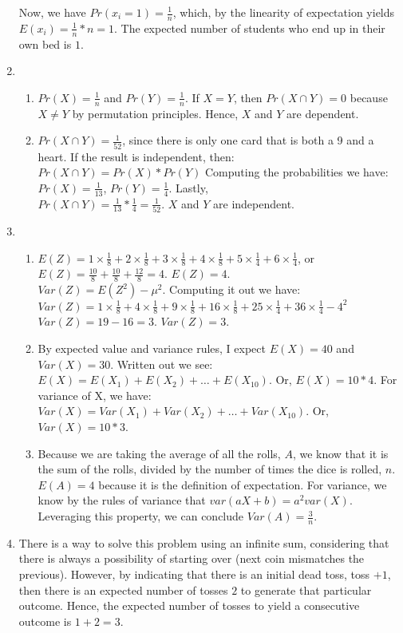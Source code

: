 \documentclass[12pt]{article}
\theoremstyle{plain}
\theoremstyle{definition}
\numberwithin{equation}{theorem}
\begin{document}
\begin{enumerate}
Now, we have $Pr(x_{i}=1)=\frac{1}{n}$, which, by the linearity of expectation yields $E(x_{i})=\frac{1}{n}*n = 1$. The expected number of students who end up in their own bed is $1$.
\item
	\begin{enumerate}
	\item $Pr(X) = \frac{1}{n}$ and $Pr(Y) = \frac{1}{n}$. If $X=Y$, then $Pr(X\cap Y)=0$ because $X \neq Y$ by permutation principles. Hence, $X$ and $Y$ are dependent.
	\addtocounter{enumii}{1}
	\item $Pr(X\cap Y) = \frac{1}{52}$, since there is only one card that is both a 9 and a heart. If the result is independent, then:\\
	$Pr(X\cap Y) = Pr(X)*Pr(Y)$ Computing the probabilities we have:\\
	$Pr(X) = \frac{1}{13}$, $Pr(Y) = \frac{1}{4}$. Lastly, \\
	$Pr(X\cap Y) = \frac{1}{13} * \frac{1}{4} = \frac{1}{52}$. $X$ and $Y$ are independent.
	\end{enumerate}
\item
	\begin{enumerate}
	\item $E(Z) = 1\times \frac{1}{8} + 2\times \frac{1}{8} + 3\times \frac{1}{8} + 4\times \frac{1}{8} + 5\times \frac{1}{4} + 6\times \frac{1}{4}$, or \\
$E(Z) = \frac{10}{8} +  \frac{10}{8} +  \frac{12}{8} = 4$. $E(Z)=4$.\\
$Var(Z) = E(Z^{2})-\mu^{2}$. Computing it out we have:\\
$Var(Z) = 1\times \frac{1}{8} + 4\times \frac{1}{8} + 9\times \frac{1}{8} + 16\times \frac{1}{8} + 25\times \frac{1}{4} + 36\times \frac{1}{4} - 4^{2}$\\
$Var(Z) = 19-16 = 3$. $Var(Z) = 3$.
	\item By expected value and variance rules, I expect $E(X) = 40$ and $Var(X) = 30$. Written out we see:\\
	$E(X) = E(X_{1})+E(X_{2}) + \dots + E(X_{10})$. Or, $E(X) = 10*4$. For variance of X, we have:\\
	$Var(X) = Var(X_{1})+Var(X_{2}) + \dots + Var(X_{10})$. Or, $Var(X) = 10*3$.
	\item Because we are taking the average of all the rolls, $A$, we know that it is the sum of the rolls, divided by the number of times the dice is rolled, $n$. $E(A) = 4$ because it is the definition of expectation. For variance, we know by the rules of variance that $var(aX+b)=a^{2}var(X)$. Leveraging this property, we can conclude $Var(A) = \frac{3}{n}$.
	\end{enumerate}
\addtocounter{enumi}{3}
\item There is a way to solve this problem using an infinite sum, considering that there is always a possibility of starting over (next coin mismatches the previous). However, by indicating that there is an initial dead toss, toss $+1$, then there is an expected number of tosses $2$ to generate that particular outcome. Hence, the expected number of tosses to yield a consecutive outcome is $1+2=3$.
\end{enumerate}
\bigskip
\end{document}
